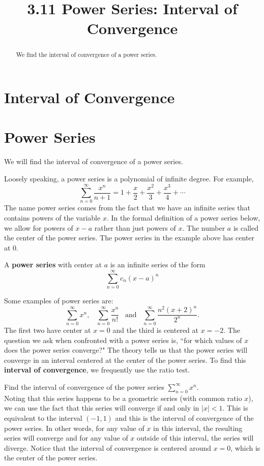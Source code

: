 \documentclass[handout]{ximera}
\title{3.11 Power Series: Interval of Convergence}
\begin{document}
\begin{abstract}
We find the interval of convergence of a power series.
\end{abstract}

\maketitle

\section{Interval of Convergence}

\section{Power Series}

We will find the interval of convergence of a power series.


Loosely speaking, a power series is a polynomial of infinite degree. For example,
\[
\sum_{n=0}^\infty \frac{x^n}{n+1} = 1 + \frac{x}{2} + \frac{x^2}{3} + \frac{x^3}{4} + \cdots
\]
The name power series comes from the fact that we have an infinite series that contains 
powers of the variable $x$. In the formal definition of a power series below, 
we allow for powers of $x-a$ rather than just powers of $x$.  
The number $a$ is called the center of the power series. 
The power series in the example above has center at $0$.
\begin{definition}
A \textbf{power series} with center at $a$ is an infinite series of the form
\[
\sum_{n=0}^\infty c_n(x-a)^n
\]
\end{definition}

Some examples of power series are:
\[ 
\sum_{n=0}^\infty x^n, \;\;\; \sum_{n=0}^\infty \frac{x^n}{n!} 
\;\;\;\text{and}\;\;\; \sum_{n=0}^\infty \frac{n^2(x+ 2)^n}{2^n}.
\]
The first two have center at $x = 0$ and the third is centered at $x = -2$. 
The question we ask when confronted with a power series is, 
``for which values of $x$ does the power series converge?"
The theory tells us that the power series will converge in an interval centered at the 
center of the power series.
To find this \textbf{interval of convergence}, we frequently use the ratio test.

\begin{example}[example 1]
Find the interval of convergence of the power series $\displaystyle{\sum_{n=0}^\infty x^n}$.\\
Noting that this series happens to be a geometric series (with common ratio $x$), 
we can use the fact that this series will converge 
if and only in $|x| < 1$.  This is equivalent to the interval $(-1, 1)$ and this is the 
interval of convergence of the power series.
In other words, for any value of $x$ in this interval, 
the resulting series will converge and for any value of $x$ outside of this interval, 
the series will diverge. Notice that the interval of convergence is centered 
around $x = 0$, which is the center of the power series.
\end{example}
\end{document}
